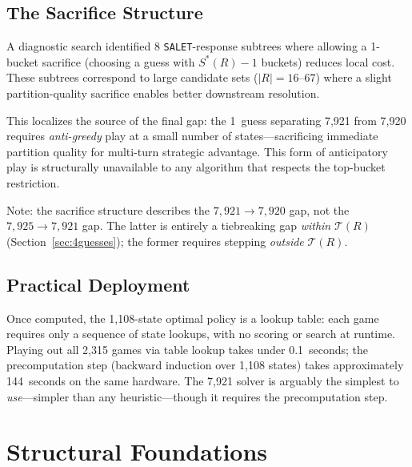 \documentclass[11pt]{article}
\begin{document}
	\subsection{The Sacrifice Structure}
	
	A diagnostic search identified 8 \texttt{SALET}-response subtrees where allowing a 1-bucket sacrifice (choosing a guess with $S^*(R)-1$ buckets) reduces local cost.  These subtrees correspond to large candidate sets ($|R| = 16$--$67$) where a slight partition-quality sacrifice enables better downstream resolution.
	
	This localizes the source of the final gap: the 1~guess separating 7,921 from 7,920 requires \emph{anti-greedy} play at a small number of states---sacrificing immediate partition quality for multi-turn strategic advantage.  This form of anticipatory play is structurally unavailable to any algorithm that respects the top-bucket restriction.
	
	Note: the sacrifice structure describes the $7{,}921 \to 7{,}920$ gap, not the $7{,}925 \to 7{,}921$ gap.  The latter is entirely a tiebreaking gap \emph{within} $\mathcal{T}(R)$ (Section~\ref{sec:4guesses}); the former requires stepping \emph{outside} $\mathcal{T}(R)$.
	
	\subsection{Practical Deployment}
	
	Once computed, the 1{,}108-state optimal policy is a lookup table: each game requires only a sequence of state lookups, with no scoring or search at runtime. Playing out all 2{,}315 games via table lookup takes under 0.1~seconds; the precomputation step (backward induction over 1{,}108 states) takes approximately 144~seconds on the same hardware. The 7,921 solver is arguably the simplest to \emph{use}---simpler than any heuristic---though it requires the precomputation step.
	
	\section{Structural Foundations}
	
\end{document}
